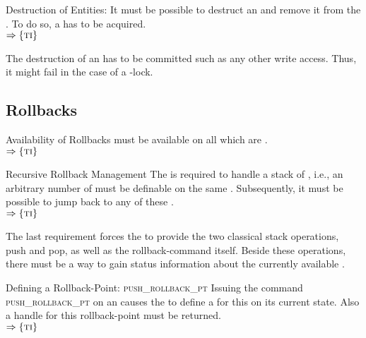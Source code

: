 \documentclass[a4paper, 12pt]{book}
\newcommand{\INTERFACE}[1]{$\Rightarrow\left\{#1\right\}$}
\begin{document}
\begin{requirement*}{Destruction  of Entities: \dbaiDESTRCUT}
  It must be possible to destruct an  and remove it from the
  . To do so, a  has to be acquired.\\
  \INTERFACE{\TRANSACTION}
\end{requirement*}
%
The destruction of an  has to be committed such as any other write
access. Thus, it might fail in the case of a \TRANSWRITE-lock. 

\subsection{Rollbacks}

\begin{requirement*}{Availability of Rollbacks}
   must be available on all  which are 
  .\\
  \INTERFACE{\TRANSACTION}
\end{requirement*}


\begin{requirement*}{Recursive Rollback Management}
  The \SYNEIGHT is required to handle a stack of ,
  i.e., an arbitrary number of  must be definable on the
  same . Subsequently, it must be possible to jump back to any of
  these . \\
  \INTERFACE{\TRANSACTION}
\end{requirement*}
%
The last requirement forces the \SYNEIGHT to provide the two classical
stack operations, push and pop, as well as the rollback-command
itself. Beside these operations, there must be a way to gain status
information about the currently available . 

\newcommand{\dbaiPUSHROLLBACK}{{\normalfont\textsc{push\_rollback\_pt}}\xspace}
\newcommand{\dbaiPOPROLLBACK}{{\normalfont\textsc{pop\_rollback\_pt}}\xspace}
\newcommand{\dbaiROLLBACK}{{\normalfont\textsc{rollback}}\xspace}
\newcommand{\dbaiNETRECOVER}{{\normalfont\textsc{net\_recover}}\xspace}

\begin{requirement*}{Defining a Rollback-Point: \dbaiPUSHROLLBACK}
  Issuing the command \dbaiPUSHROLLBACK on an  causes the
  \SYNEIGHT to define a  for this  on its
  current state. Also a handle for this rollback-point must be returned.\\
  \INTERFACE{\TRANSACTION}
\end{requirement*}
\end{document}
